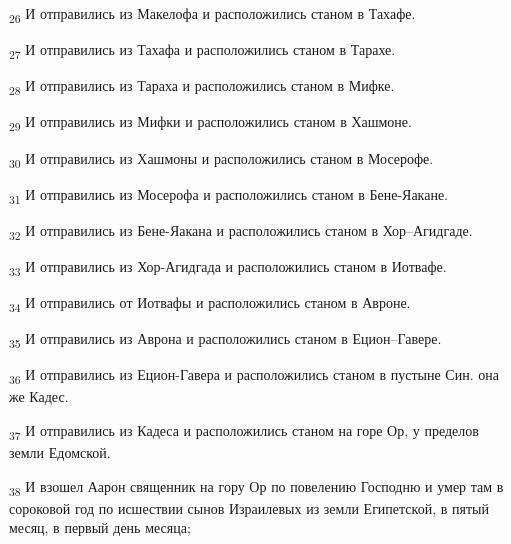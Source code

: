 \begin{tcolorbox}
\textsubscript{26} И отправились из Макелофа и расположились станом в Тахафе.
\end{tcolorbox}
\begin{tcolorbox}
\textsubscript{27} И отправились из Тахафа и расположились станом в Тарахе.
\end{tcolorbox}
\begin{tcolorbox}
\textsubscript{28} И отправились из Тараха и расположились станом в Мифке.
\end{tcolorbox}
\begin{tcolorbox}
\textsubscript{29} И отправились из Мифки и расположились станом в Хашмоне.
\end{tcolorbox}
\begin{tcolorbox}
\textsubscript{30} И отправились из Хашмоны и расположились станом в Мосерофе.
\end{tcolorbox}
\begin{tcolorbox}
\textsubscript{31} И отправились из Мосерофа и расположились станом в Бене-Яакане.
\end{tcolorbox}
\begin{tcolorbox}
\textsubscript{32} И отправились из Бене-Яакана и расположились станом в Хор--Агидгаде.
\end{tcolorbox}
\begin{tcolorbox}
\textsubscript{33} И отправились из Хор-Агидгада и расположились станом в Иотвафе.
\end{tcolorbox}
\begin{tcolorbox}
\textsubscript{34} И отправились от Иотвафы и расположились станом в Авроне.
\end{tcolorbox}
\begin{tcolorbox}
\textsubscript{35} И отправились из Аврона и расположились станом в Ецион--Гавере.
\end{tcolorbox}
\begin{tcolorbox}
\textsubscript{36} И отправились из Ецион-Гавера и расположились станом в пустыне Син. она же Кадес.
\end{tcolorbox}
\begin{tcolorbox}
\textsubscript{37} И отправились из Кадеса и расположились станом на горе Ор, у пределов земли Едомской.
\end{tcolorbox}
\begin{tcolorbox}
\textsubscript{38} И взошел Аарон священник на гору Ор по повелению Господню и умер там в сороковой год по исшествии сынов Израилевых из земли Египетской, в пятый месяц, в первый день месяца;
\end{tcolorbox}
